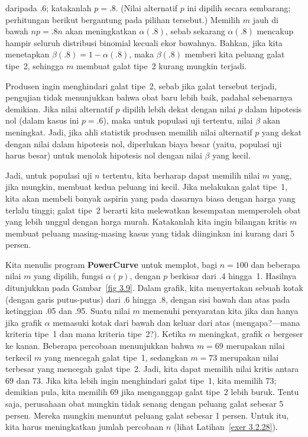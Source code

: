 \begin{example}
daripada .6; katakanlah $p = .8$.  (Nilai alternatif $p$ ini dipilih secara sembarang;
perhitungan berikut bergantung pada pilihan tersebut.)  Memilih $m$ jauh di bawah $np =
.8n$ akan meningkatkan $\alpha(.8)$, sebab sekarang $\alpha(.8)$ mencakup hampir seluruh
distribusi binomial kecuali ekor bawahnya.  Bahkan, jika kita menetapkan
$\beta(.8) = 1 - \alpha(.8)$, maka $\beta(.8)$ memberi kita peluang galat tipe~2,
sehingga  $m$ membuat galat tipe~2 kurang mungkin terjadi.
\par Produsen ingin menghindari galat tipe~2, sebab jika galat tersebut terjadi,
pengujian tidak menunjukkan bahwa obat baru lebih baik, padahal sebenarnya demikian.
Jika nilai alternatif $p$ dipilih lebih dekat dengan nilai $p$ dalam hipotesis nol
(dalam kasus ini $p =.6$), maka untuk populasi uji tertentu, nilai $\beta$ akan meningkat.
Jadi, jika ahli statistik produsen memilih nilai alternatif $p$ yang dekat dengan nilai
dalam hipotesis nol, diperlukan biaya besar (yaitu, populasi uji harus besar) untuk
menolak hipotesis nol dengan nilai $\beta$ yang kecil.
\par Jadi, untuk populasi uji $n$ tertentu, kita berharap dapat memilih nilai $m$ yang,
jika mungkin, membuat kedua peluang ini kecil.  Jika melakukan galat tipe~1, kita akan
membeli banyak aspirin yang pada dasarnya biasa dengan harga yang terlalu tinggi;
galat tipe~2 berarti kita melewatkan kesempatan memperoleh obat yang lebih unggul dengan
harga murah.  Katakanlah kita ingin bilangan kritis $m$ membuat peluang masing-masing
kasus yang tidak diinginkan ini kurang dari 5 persen.
\par Kita menulis program {\bf PowerCurve} untuk memplot,
bagi $n = 100$ dan beberapa nilai $m$ yang dipilih, fungsi $\alpha(p)$, dengan $p$
berkisar dari .4 hingga~1.  Hasilnya ditunjukkan pada Gambar~\ref{fig 3.9}.  Dalam grafik,
kita menyertakan sebuah kotak (dengan garis putus-putus) dari .6 hingga .8, dengan sisi
bawah dan atas pada ketinggian .05 dan .95.  Suatu nilai $m$ memenuhi persyaratan kita
jika dan hanya jika grafik $\alpha$ memasuki kotak dari bawah dan keluar dari atas
(mengapa?---mana kriteria tipe~1 dan mana kriteria tipe~2?).  Ketika $m$ meningkat,
grafik $\alpha$ bergeser ke kanan.  Beberapa percobaan menunjukkan bahwa $m = 69$
merupakan nilai terkecil $m$ yang mencegah galat tipe~1, sedangkan $m = 73$ merupakan
nilai terbesar yang mencegah galat tipe~2.  Jadi, kita dapat memilih nilai kritis antara
69 dan 73.  Jika kita lebih ingin menghindari galat tipe~1, kita memilih 73; demikian
pula, kita memilih 69 jika menganggap galat tipe~2 lebih buruk.  Tentu saja, perusahaan
obat mungkin tidak senang dengan peluang galat sebesar 5 persen.  Mereka mungkin
menuntut peluang galat sebesar 1 persen.  Untuk itu, kita harus meningkatkan jumlah
percobaan $n$ (lihat Latihan~\ref{exer 3.2.28}).
\end{example}

